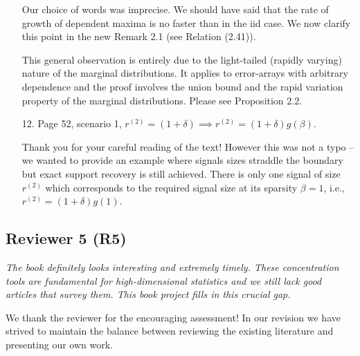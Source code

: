 \documentclass[11pt]{article}
\begin{document}
\begin{itemize}
    Our choice of words was imprecise. We should have said that the rate of growth of dependent maxima is no faster than in the iid case.  
    We now clarify this point in the new Remark 2.1 (see Relation (2.41)). 
  
    This general observation is entirely due to the light-tailed (rapidly varying) nature of the marginal distributions.  It applies to error-arrays with arbitrary
    dependence and the proof involves the union bound and the rapid variation property of the marginal distributions.  Please see Proposition 2.2.
   
    \item[12.] {Page 52, scenario 1, $r^{(2)} = (1 + \delta) \implies r^{(2)} = (1 + \delta)g(\beta)$.}
    
    Thank you for your careful reading of the text! 
    However this was not a typo -- we wanted to provide an example where signals sizes straddle the boundary but exact support recovery is still achieved. 
    There is only one signal of size $r^{(2)}$ which corresponds to the required signal size at its sparsity $\beta=1$, i.e., $r^{(2)} = (1 + \delta)g(1)$.
 
\end{itemize}

   \subsection{Reviewer 5 (R5)}
   
  {\em The book definitely looks interesting and extremely timely. These concentration tools are fundamental for high-dimensional statistics 
  and we still lack good articles that survey them. This book project fills in this crucial gap.}
  
  
  \bigskip
\noindent   We thank the reviewer for the encouraging assessment!  In our revision we have strived to maintain the balance between reviewing the
   existing literature and presenting our own work.  
   
   
   
\end{document}

